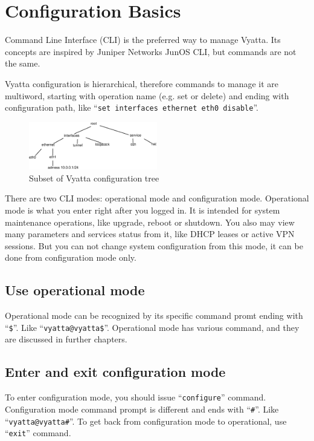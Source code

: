 \chapter{Configuration Basics}
Command Line Interface (CLI) is the preferred way to manage Vyatta. Its concepts are inspired by Juniper Networks
JunOS CLI, but commands are not the same.

Vyatta configuration is hierarchical, therefore commands to manage it are multiword, starting with operation name 
(e.g. set or delete) and ending with configuration path, like ``\texttt{set interfaces ethernet eth0 disable}''.

\begin{figure}[hc]
 \begin{center}
   \includegraphics[width=0.5\textwidth]{images/config_tree.eps}
   \caption{Subset of Vyatta configuration tree}
  \end{center}
\end{figure}


There are two CLI modes: operational mode and configuration mode. Operational mode is what you enter right after
you logged in. It is intended for system maintenance operations, like upgrade, reboot or shutdown. You also may view
many parameters and services status from it, like DHCP leases or active VPN sessions. But you can not change system
configuration from this mode, it can be done from configuration mode only.

\section{Use operational mode}
Operational mode can be recognized by its specific command promt ending with ``\texttt{\$}''.
Like ``\texttt{vyatta@vyatta\$}''. Operational mode has various command, and they are discussed in further chapters.

\section{Enter  and exit configuration mode}
To enter configuration mode, you should issue ``\texttt{configure}'' command. Configuration mode command prompt is
different and ends with ``\texttt{\#}''. Like ``\texttt{vyatta@vyatta\#}''. To get back from configuration mode to
operational, use ``\texttt{exit}'' command.

